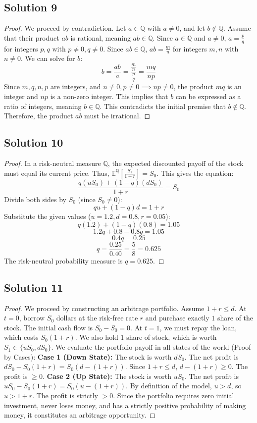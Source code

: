 \documentclass[11pt]{article}
\begin{document}
\subsection{Solution 9}
\begin{proof}
We proceed by contradiction. Let $a \in \mathbb{Q}$ with $a \neq 0$, and let $b \notin \mathbb{Q}$. Assume that their product $ab$ is rational, meaning $ab \in \mathbb{Q}$.
Since $a \in \mathbb{Q}$ and $a \neq 0$, $a = \frac{p}{q}$ for integers $p, q$ with $p \neq 0, q \neq 0$.
Since $ab \in \mathbb{Q}$, $ab = \frac{m}{n}$ for integers $m, n$ with $n \neq 0$.
We can solve for $b$:
\[ b = \frac{ab}{a} = \frac{\frac{m}{n}}{\frac{p}{q}} = \frac{mq}{np} \]
Since $m, q, n, p$ are integers, and $n \neq 0, p \neq 0 \implies np \neq 0$, the product $mq$ is an integer and $np$ is a non-zero integer. 
This implies that $b$ can be expressed as a ratio of integers, meaning $b \in \mathbb{Q}$. 
This contradicts the initial premise that $b \notin \mathbb{Q}$. Therefore, the product $ab$ must be irrational.
\end{proof}

\subsection{Solution 10}
\begin{proof}
In a risk-neutral measure $\mathbb{Q}$, the expected discounted payoff of the stock must equal its current price. Thus, $\mathbb{E}^{\mathbb{Q}}\left[\frac{S_1}{1+r}\right] = S_0$.
This gives the equation:
\[ \frac{q(uS_0) + (1-q)(dS_0)}{1+r} = S_0 \]
Divide both sides by $S_0$ (since $S_0 \neq 0$):
\[ q u + (1-q) d = 1+r \]
Substitute the given values ($u = 1.2, d = 0.8, r = 0.05$):
\[ q(1.2) + (1-q)(0.8) = 1.05 \]
\[ 1.2q + 0.8 - 0.8q = 1.05 \]
\[ 0.4q = 0.25 \]
\[ q = \frac{0.25}{0.40} = \frac{5}{8} = 0.625 \]
The risk-neutral probability measure is $q = 0.625$.
\end{proof}

\subsection{Solution 11}
\begin{proof}
We proceed by constructing an arbitrage portfolio. Assume $1+r \le d$. 
At $t=0$, borrow $S_0$ dollars at the risk-free rate $r$ and purchase exactly $1$ share of the stock. The initial cash flow is $S_0 - S_0 = 0$.
At $t=1$, we must repay the loan, which costs $S_0(1+r)$. We also hold $1$ share of stock, which is worth $S_1 \in \{uS_0, dS_0\}$.
We evaluate the portfolio payoff in all states of the world (Proof by Cases):
\textbf{Case 1 (Down State):} The stock is worth $dS_0$. The net profit is $dS_0 - S_0(1+r) = S_0(d - (1+r))$. Since $1+r \le d$, $d - (1+r) \ge 0$. The profit is $\ge 0$.
\textbf{Case 2 (Up State):} The stock is worth $uS_0$. The net profit is $uS_0 - S_0(1+r) = S_0(u - (1+r))$. By definition of the model, $u > d$, so $u > 1+r$. The profit is strictly $> 0$.
Since the portfolio requires zero initial investment, never loses money, and has a strictly positive probability of making money, it constitutes an arbitrage opportunity.
\end{proof}
\end{document}

